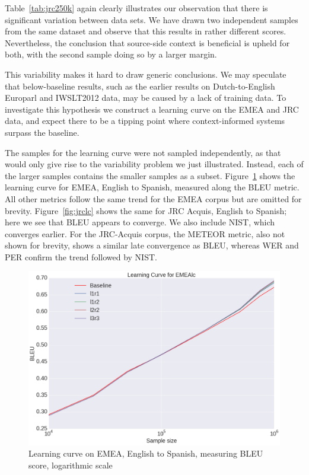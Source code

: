 \documentclass[smallextended]{svjour3}       %
\theoremstyle{break}
\begin{document}
Table~\ref{tab:jrc250k} again clearly illustrates our observation that there is
significant variation between data sets. We have drawn two independent samples
from the same dataset and observe that this results in rather different scores.
Nevertheless, the conclusion that source-side context is beneficial is upheld
for both, with the second sample doing so by a larger margin. 

This variability makes it hard to draw generic conclusions.  We may speculate
that below-baseline results, such as the earlier results on Dutch-to-English
Europarl and IWSLT2012 data, may be caused by a lack of training data. To
investigate this hypothesis we construct a learning curve on the EMEA and JRC
data, and expect there to be a tipping point where context-informed systems
surpass the baseline.

The samples for the learning curve were not sampled independently, as that
would only give rise to the variability problem we just illustrated.  Instead,
each of the larger samples contains the smaller samples as a subset.
Figure~\ref{fig:emealc} shows the learning curve for EMEA, English to Spanish,
measured along the BLEU metric. All other metrics follow the same trend for the
EMEA corpus but are omitted for brevity. Figure~\ref{fig:jrclc} shows the same for JRC Acquis, English to
Spanish; here we see that BLEU appears to converge. We also include
NIST, which converges earlier. For the JRC-Acquis corpus, the METEOR metric,
also not shown for brevity, shows a similar late convergence as BLEU, whereas WER and PER confirm
the trend followed by NIST.

\begin{figure}
\includegraphics[width=120.00mm]{emealcbleu.png}
\caption{Learning curve on EMEA, English to Spanish, measuring BLEU score, logarithmic scale}
\label{fig:emealc}
\end{figure}
\end{document}

